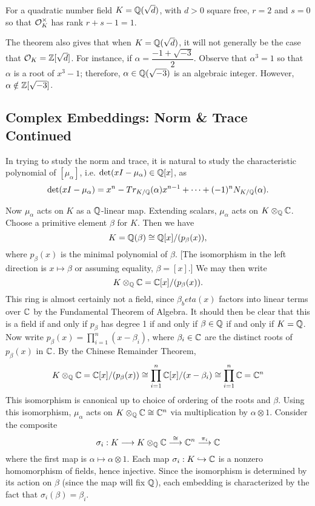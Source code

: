 \begin{ex}
For a quadratic number field $K=\mathbb{Q}(\sqrt{d})$, with $d>0$ square free, $r=2$ and $s=0$ so that $\mathcal{O}_K^\times$ has rank $r+s-1=1$. \xqed
\end{ex}

\begin{ex}
The theorem also gives that when $K=\mathbb{Q}(\sqrt{d})$, it will not generally be the case that $\mathcal{O}_K= \mathbb{Z}[\sqrt{d}]$. For instance, if $\alpha=\dfrac{-1+\sqrt{-3}}{2}$. Observe that $\alpha^3=1$ so that $\alpha$ is a root of $x^3-1$; therefore, $\alpha \in \mathbb{Q}(\sqrt{-3})$ is an algebraic integer. However, $\alpha \notin \mathbb{Z}[\sqrt{-3}]$. \xqed
\end{ex}


\subsection{Complex Embeddings: Norm \& Trace Continued}


In trying to study the norm and trace, it is natural to study the characteristic polynomial of $[\mu_\alpha]$, i.e. $\det(xI-\mu_\alpha) \in \mathbb{Q}[x]$, as
	\[
	\det(xI-\mu_\alpha)=x^n - Tr_{K/\mathbb{Q}}(\alpha)x^{n-1} + \cdots + (-1)^n N_{K/\mathbb{Q}}(\alpha).
	\]

Now $\mu_\alpha$ acts on $K$ as a $\mathbb{Q}$-linear map. Extending scalars, $\mu_\alpha$ acts on $K \otimes_{\mathbb{Q}} \mathbb{C}$. Choose a primitive element $\beta$ for $K$. Then we have
	\[
	K=\mathbb{Q}(\beta) \cong \mathbb{Q}[x]/ (p_\beta(x)),
	\]
where $p_\beta(x)$ is the minimal polynomial of $\beta$. [The isomorphism in the left direction is $x \mapsto \beta$ or assuming equality, $\beta=[x]$.] We may then write
	\[
	K \otimes_{\mathbb{Q}} \mathbb{C}= \mathbb{C}[x]/(p_\beta(x)).
	\]
This ring is almost certainly not a field, since $\beta_beta(x)$ factors into linear terms over $\mathbb{C}$ by the Fundamental Theorem of Algebra. It should then be clear that this is a field if and only if $p_\beta$ has degree 1 if and only if $\beta \in \mathbb{Q}$ if and only if $K=\mathbb{Q}$. Now write $p_\beta(x)=\prod_{i=1}^n (x-\beta_i)$, where $\beta_i \in \mathbb{C}$ are the distinct roots of $p_\beta(x)$ in $\mathbb{C}$. By the Chinese Remainder Theorem,
	\[
	K \otimes_{\mathbb{Q}} \mathbb{C}= \mathbb{C}[x]/(p_\beta(x)) \cong \prod_{i=1}^n \mathbb{C}[x]/(x-\beta_i) \cong \prod_{i=1}^n \mathbb{C} =\mathbb{C}^n
	\]
This isomorphism is canonical up to choice of ordering of the roots and $\beta$. Using this isomorphism, $\mu_\alpha$ acts on $K \otimes_{\mathbb{Q}} \mathbb{C} \cong \mathbb{C}^n$ via multiplication by $\alpha \otimes 1$. Consider the composite
	\[
	\sigma_i: K \stackrel{}{\longrightarrow} K \otimes_{\mathbb{Q}} \mathbb{C} \stackrel{\cong}{\longrightarrow} \mathbb{C}^n \stackrel{\pi_i}{\longrightarrow} \mathbb{C}
	\]
where the first map is $\alpha \mapsto \alpha \otimes 1$. Each map $\sigma_i: K \hookrightarrow \mathbb{C}$ is a nonzero homomorphism of fields, hence injective. Since the isomorphism is determined by its action on $\beta$ (since the map will fix $\mathbb{Q}$), each embedding is characterized by the fact that $\sigma_i(\beta)=\beta_i$. 

